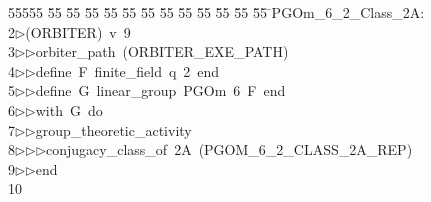 %
%
\begin{tabbing}
55555 \= 55 \= 55 \= 55 \= 55 \= 55 \= 55 \= 55 \= 55 \= 55 \= 55 \= 55 \= 55 \= \>PGOm\_6\_2\_Class\_2A:\\[0pt]
2\>$\triangleright$\>(ORBITER)\ v\ 9\ \\[0pt]
3\>$\triangleright$\>$\triangleright$\>orbiter\_path\ (ORBITER\_EXE\_PATH)\ \\[0pt]
4\>$\triangleright$\>$\triangleright$\>define\ F\ finite\_field\ q\ 2\ end\ \\[0pt]
5\>$\triangleright$\>$\triangleright$\>define\ G\ linear\_group\ PGOm\ 6\ F\ end\ \\[0pt]
6\>$\triangleright$\>$\triangleright$\>with\ G\ do\ \\[0pt]
7\>$\triangleright$\>$\triangleright$\>group\_theoretic\_activity\ \\[0pt]
8\>$\triangleright$\>$\triangleright$\>$\triangleright$\>conjugacy\_class\_of\ 2A\ (PGOM\_6\_2\_CLASS\_2A\_REP)\ \\[0pt]
9\>$\triangleright$\>$\triangleright$\>end\\[0pt]
10\>\end{tabbing}
